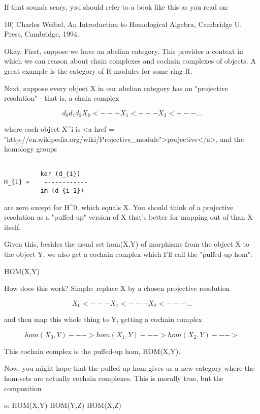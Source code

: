 If that sounds scary, you should refer to a book like this as you 
read on:

10) Charles Weibel, An Introduction to Homological Algebra, 
Cambridge U. Press, Cambridge, 1994. 

Okay.  First, suppose we have an abelian category.  This provides a 
context in which we can reason about chain complexes and cochain 
complexes of objects.  A great example is the category of R-modules 
for some ring R.  

Next, suppose every object X in our abelian category has an 
"projective resolution" - that is, a chain complex 


$$

    d_{0}      d_{1}      d_{2}
X_{0} <--- X_{1} <--- X_{2} <--- ...
$$
    
where each object X^{i} is 
<a href = "http://en.wikipedia.org/wiki/Projective_module">projective</a>, and the homology groups


\begin{verbatim}

          ker (d_{i})  
H_{i} =    ------------
          im (d_{i-1})
\end{verbatim}
    
are zero except for H^{0}, which equals X.  You should think of
a projective resolution as a "puffed-up" version of X that's
better for mapping out of than X itself.  

Given this, besides the usual set hom(X,Y) of morphisms from the 
object X to the object Y, we also get a cochain complex which I'll 
call the "puffed-up hom":

HOM(X,Y)

How does this work?  Simple: replace X by a chosen projective
resolution 


$$

X_{0} <--- X_{1} <--- X_{2} <--- ...
$$
    

and then map this whole thing to Y, getting a cochain complex


$$

hom(X_{0},Y) ---> hom(X_{1},Y) ---> hom(X_{2},Y) --- >
$$
    
This cochain complex is the puffed-up hom, HOM(X,Y).  

Now, you might hope that the puffed-up hom gives us a new category 
where the hom-sets are actually cochain complexes.  This is morally
true, but the composition

o: HOM(X,Y) \times  HOM(Y,Z) \to  HOM(X,Z)

